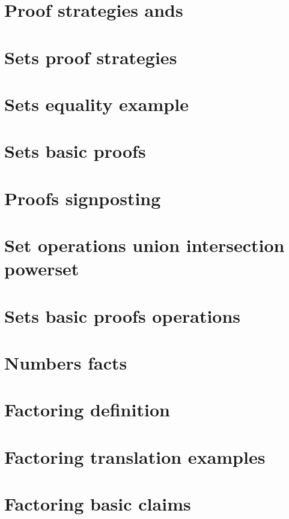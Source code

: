 \section*{Proof strategies ands}

\vfill
\section*{Sets proof strategies}

\vfill
\section*{Sets equality example}

\vfill
\section*{Sets basic proofs}

\vfill
\section*{Proofs signposting}

\vfill
\section*{Set operations union intersection powerset}

\vfill
\section*{Sets basic proofs operations}

\vfill
\section*{Numbers facts}

\vfill
\section*{Factoring definition}

\vfill
\section*{Factoring translation examples}

\vfill
\section*{Factoring basic claims}

\vfill
